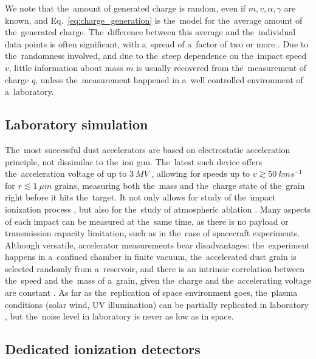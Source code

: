 We note that the~amount of generated charge is random, even if $m,v,\alpha,\gamma$ are known, and Eq.~\ref{eq:charge_generation} is the~model for the~average amount of the~generated charge. The~difference between this average and the~individual data points is often significant, with a~spread of a~factor of two or more \citep{collette2014micrometeoroid,shen2021cosmic}. Due to the~randomness involved, and due to the~steep dependence on the~impact speed $v$, little information about mass $m$ is usually recovered from the~measurement of charge $q$, unless the~measurement happened in a~well controlled environment of a~laboratory.

\subsection{Laboratory simulation}

The~most successful dust accelerators are based on electrostatic acceleration principle, not dissimilar to the~ion gun. The~latest such device offers the~acceleration voltage of up to $\SI{3}{MV}$ \citep{shu20123}, allowing for speeds up to $v\gtrsim \SI{50}{kms^{-1}}$ for $r\lesssim\SI{1}{\mu m}$ grains, measuring both the~mass and the~charge state of the~grain right before it hits the~target. It not only allows for study of the~impact ionization process \citep{shen2021electrostatic,shen2021laboratory,shen2023variability,nouzak2018laboratory,nouzak2021detection,kovcivsvcak2020effective,collette2014micrometeoroid}, but also for the~study of atmospheric ablation \citep{thomas2017experimental,deluca2018ionization,deluca2022differential,tarnecki2023experimentally}. Many aspects of each impact can be measured at the~same time, as there is no payload or transmission capacity limitation, such as in the~case of spacecraft experiments. Although versatile, accelerator measurements bear disadvantages: the~experiment happens in a~confined chamber in finite vacuum, the~accelerated dust grain is selected randomly from a~reservoir, and there is an intrinsic correlation between the~speed and the~mass of a~grain, given the~charge and the~accelerating voltage are constant \citep{shelton1960electrostatic}. As far as the~replication of space environment goes, the~plasma conditions (solar wind, UV illumination) can be partially replicated in laboratory \citep{shu20123,horanyi2008surface}, but the~noise level in laboratory is never as low as in space. 

\subsection{Dedicated ionization detectors}

